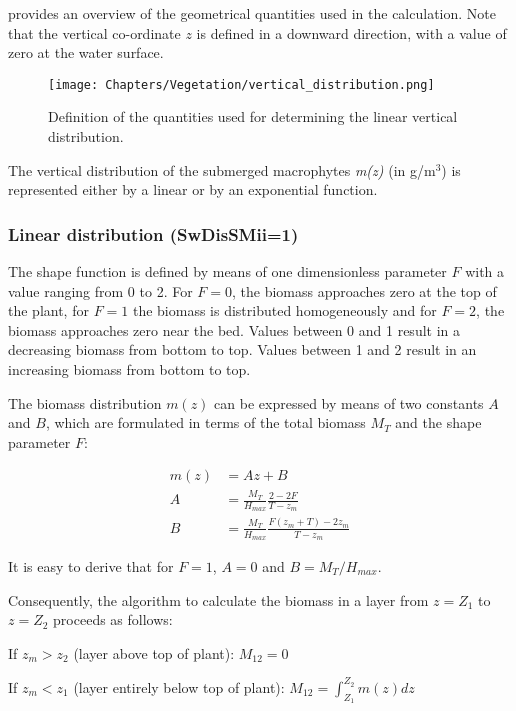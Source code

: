  provides an overview of the geometrical quantities used in the calculation. Note that the
vertical co-ordinate $z$ is defined in a downward direction, with a value of zero at the water surface.

\begin{figure}
\centering
\texttt{[image: Chapters/Vegetation/vertical\_distribution.png]}
\caption{Definition of the quantities used for determining the linear vertical distribution.}
\label{fig:verticalDistribution}
\end{figure}

The vertical distribution of the submerged macrophytes \emph{m(z)} (in g/m$^3$) is represented either by a linear or
by an exponential function.

\subsubsection{Linear distribution (SwDisSMii=1)}
The shape function is defined by means of one dimensionless parameter $F$ with a value ranging from 0 to 2.
For $F = 0$, the biomass approaches zero at the top of the plant,
for $F = 1$ the biomass is distributed homogeneously and for $F = 2$, the biomass approaches zero near
the bed. Values between 0 and 1 result in a decreasing biomass from bottom to top. Values between 1 and 2 result
in an increasing biomass from bottom to top.

The biomass distribution $m(z)$ can be expressed by means of two constants $A$ and $B$, which are
formulated in terms of the total biomass $M_T$ and the shape parameter $F$:

\begin{align}
           m(z) &=  Az + B                                  \\
\nonumber  A    &=  \frac{M_T}{H_{max}} \frac{2-2F}{T- z_m} \\
\nonumber  B    &=  \frac{M_T}{H_{max}} \frac{F(z_m + T) - 2z_m}{T- z_m}
\end{align}

It is easy to derive that for $F = 1$, $A = 0$ and $B = M_T/H_{max}$.

Consequently, the algorithm to calculate the biomass in a layer from $z = Z_1$ to $z = Z_2$ proceeds as follows:

If $z_m > z_2$ (layer above top of plant): $M_{12} = 0$

If $z_m < z_1$ (layer entirely below top of plant): $M_{12} = \int_{Z_1}^{Z_2} m(z)dz$

